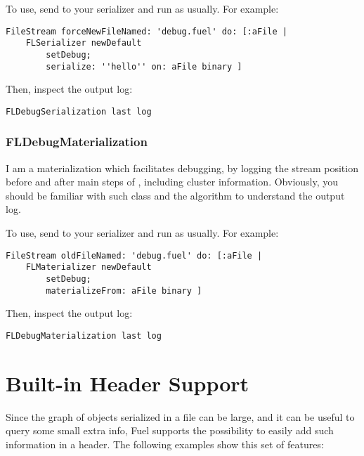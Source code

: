 \documentclass[a4paper,10pt,twoside]{book}
\begin{document}
To use, send  to your serializer and run as usually. For example:

\begin{lstlisting}
FileStream forceNewFileNamed: 'debug.fuel' do: [:aFile |
    FLSerializer newDefault
        setDebug;
        serialize: ''hello'' on: aFile binary ]
\end{lstlisting}

Then, inspect the output log:

\begin{lstlisting}
FLDebugSerialization last log
\end{lstlisting}

\subsubsection{FLDebugMaterialization}
I am a materialization which facilitates debugging, by logging the stream position before and after main steps of , including cluster information. Obviously, you should be familiar with such class and the algorithm to understand the output log.

To use, send  to your serializer and run as usually. For example:

\begin{lstlisting}
FileStream oldFileNamed: 'debug.fuel' do: [:aFile |
    FLMaterializer newDefault
        setDebug;
        materializeFrom: aFile binary ]
\end{lstlisting}

Then, inspect the output log:

\begin{lstlisting}
FLDebugMaterialization last log
\end{lstlisting}



\section{Built-in Header Support}

Since the graph of objects serialized in a file can be large, and it can be useful to query some small extra info, Fuel supports the possibility to easily add such information in a header. The following examples show this set of features:
 
\end{document}
